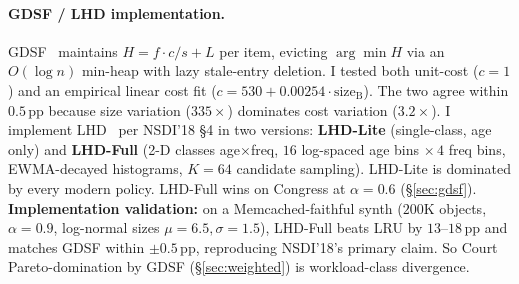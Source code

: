 \documentclass[letterpaper,twocolumn,10pt]{article}
\begin{document}
\paragraph{GDSF / LHD implementation.}
GDSF~\cite{cherkasova1998gdsf} maintains $H = f \cdot c / s + L$ per
item, evicting $\arg\min H$ via an $O(\log n)$ min-heap with lazy
stale-entry deletion. I tested both unit-cost ($c=1$) and an
empirical linear cost fit ($c = 530 + 0.00254 \cdot
\text{size}_{\text{B}}$). The two agree within $0.5$\,pp because
size variation ($335\times$) dominates cost variation
($3.2\times$). I implement LHD~\cite{beckmann2018lhd} per NSDI'18
\S 4 in two versions: \textbf{LHD-Lite} (single-class, age only)
and \textbf{LHD-Full} (2-D classes age$\times$freq, $16$ log-spaced
age bins $\times\,4$ freq bins, EWMA-decayed histograms, $K=64$
candidate sampling). LHD-Lite is dominated by every modern policy.
LHD-Full wins on Congress at $\alpha=0.6$ (\S\ref{sec:gdsf}).
\textbf{Implementation validation:} on a Memcached-faithful synth
($200$K objects, $\alpha=0.9$, log-normal sizes
$\mu=6.5,\sigma=1.5$), LHD-Full beats LRU by $13$--$18$\,pp and
matches GDSF within $\pm 0.5$\,pp, reproducing NSDI'18's primary
claim. So Court Pareto-domination by GDSF (\S\ref{sec:weighted}) is
 workload-class divergence.
\end{document}
